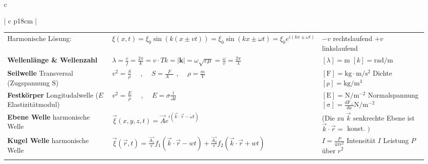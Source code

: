 \begin{tabular}{c}
\begin{tabular}{ | c   p{18cm} |}
\begin{tabular}{L{5cm} L{7cm} L{5cm}}
				\rowcolor[rgb]{0.91,0.91,0.91}
				Harmonische Lösung: & 
				$\displaystyle \xi(x, t) =\xi_{0} \sin (k(x \pm v t))=\xi_{0} \sin (k x \pm \omega t) =\xi_{0} e^{i(k x \pm \omega t)}
				$ & 
				$-v$ rechtslaufend $+v$ linkslaufend \\[10pt]
				
				\rowcolor[rgb]{1,1,1}
				\textbf{Wellenlänge \& Wellenzahl}  &$\displaystyle \lambda=\frac{v}{f}=\frac{2\pi}{k}=v\cdot T$\qquad $\displaystyle k=|\mathbf{k}|=\omega \sqrt{\varepsilon \mu}=\frac{\omega}{v}=\frac{2 \pi}{\lambda}$ & $\left[\lambda\right]=\mathrm{m}$ $[k]=\mathrm{rad} / \mathrm{m}$\\[10pt]
				
				\textbf{Seilwelle} Transversal (Zugspannung $\mathrm{S}$) & $\displaystyle v^{2}=\frac{S}{\rho} \quad$ , $\displaystyle\quad S=\frac{F}{A\quad}$ , $\displaystyle \quad\rho=\frac{m}{V} \quad$&
				$\left[\mathrm{F}\right]=\mathrm{kg}\cdot\mathrm{m}/\mathrm{s} ^{2}$\qquad\qquad\qquad
				Dichte
				$\left[\mathrm{\rho}\right]=\mathrm{kg}/\mathrm{m}^{3}$ \\[5pt]
				
				
				\textbf{Festkörper} Longitudalwelle \quad ($E$ Elastizitätmodul)  & $\displaystyle v^{2}=\frac{E}{\rho} \quad$ , $\displaystyle\quad E=\sigma\frac{l}{\Delta l}$&
				$\left[\mathrm{E}\right]=\mathrm{N}/\mathrm{m}^{-2}$\qquad
				Normalspannung
				 $\left[\mathrm{\sigma}\right]=\frac{\mathrm{dF_{\bot}}}{da}\mathrm{N}/\mathrm{m}^{-2}$ \\[5pt]
				
				
				\textbf{Ebene Welle}  \qquad \qquad harmonische Welle  & $\displaystyle \vec{\xi}(x, y, z, t)=\vec{A} e^{i(\vec{k} \cdot \vec{r}-\omega t)}$&
				(Die zu $\vec{k}$ senkrechte Ebene ist $\vec{k} \cdot \vec{r}=$ konst. $)$\\[5pt]
				
				\textbf{Kugel Welle} \qquad \qquad harmonische Welle  & $\displaystyle \vec{\xi}(\vec{r}, t)=\frac{\overrightarrow{A_{1}}}{r} f_{1}(\vec{k} \cdot \vec{r}-w t)+\frac{\overrightarrow{A_{2}}}{r} f_{2}(\vec{k} \cdot \vec{r}+w t)$& $\displaystyle I = \frac{P}{4\pi r^2}$ Intensität $I$ \qquad Leistung $P$ über $r^2$
				\\
				
				\\
	

\end{tabular}
\end{tabular}
\end{tabular}
